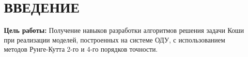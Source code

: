 \chapter*{\hfill{}ВВЕДЕНИЕ\hfill}

\textbf{Цель работы:} Получение навыков разработки  алгоритмов решения задачи Коши при реализации моделей, построенных на системе ОДУ, с использованием методов Рунге-Кутта 2-го и 4-го порядков точности.

